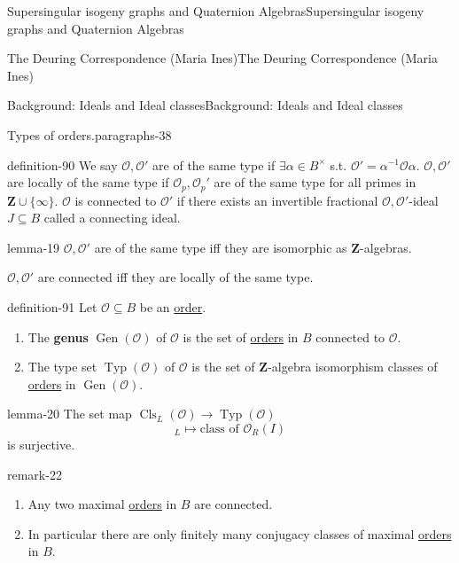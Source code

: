 \documentclass[10pt,]{book}
\newcommand{\terminology}[1]{\textbf{#1}}
\numberwithin{equation}{section}
\newcommand{\inv}{^{-1}}
\newcommand{\ZZ}{\mathbf{Z}}
\newcommand{\ints}{\mathcal{O}}
\begin{document}
\begin{chapterptx}{Supersingular isogeny graphs and Quaternion Algebras}{}{Supersingular isogeny graphs and Quaternion Algebras}{}{}
\begin{sectionptx}{The Deuring Correspondence (Maria Ines)}{}{The Deuring Correspondence (Maria Ines)}{}{}
\begin{subsectionptx}{Background: Ideals and Ideal classes}{}{Background: Ideals and Ideal classes}{}{}
\begin{paragraphs}{Types of orders.}{paragraphs-38}
\begin{definition}{}{definition-90}
\hypertarget{p-949}{}%
We say \(\ints,\ints' \) are of the same type if \(\exists \alpha \in B^\times\) s.t. \(\ints ' = \alpha \inv \ints \alpha\). \(\ints,\ints'\) are locally of the same type if \(\ints_p, \ints_p'\) are of the same type for all primes in \(\ZZ\cup\{\infty\}\). \(\ints\) is connected to  \(\ints'\) if there exists an invertible fractional \(\ints,\ints'\)-ideal \(J \subseteq B\) called a connecting ideal.%
\end{definition}
\begin{lemma}{}{}{lemma-19}%
\hypertarget{p-950}{}%
\(\ints,\ints'\) are of the same type iff they are isomorphic as \(\ZZ\)-algebras.%
\par
\hypertarget{p-951}{}%
\(\ints,\ints'\) are connected iff they are locally of the same type.%
\end{lemma}
\begin{definition}{}{definition-91}%
\hypertarget{p-952}{}%
Let \(\ints \subseteq B\) be an \hyperref[def-order-quaternion]{order}.\leavevmode%
\begin{enumerate}
\item\hypertarget{li-236}{}The \terminology{genus} \(\operatorname{Gen}(\ints)\) of \(\ints \) is the set of \hyperref[def-order-quaternion]{orders} in \(B \) connected to \(\ints\).%
\item\hypertarget{li-237}{}The type set \(\operatorname{Typ}(\ints)\) of \(\ints\) is the set of \(\ZZ\)-algebra isomorphism classes of \hyperref[def-order-quaternion]{orders} in \(\operatorname{Gen} (\ints)\).%
\end{enumerate}
%
\end{definition}
\begin{lemma}{}{}{lemma-20}%
\hypertarget{p-953}{}%
The set map \(\operatorname{Cls}_L(\ints) \to \operatorname{Typ}(\ints)\)%
\begin{equation*}
[ I]_L \mapsto \text{class of } \ints_R(I)
\end{equation*}
is surjective.%
\end{lemma}
\begin{remark}{}{remark-22}%
\hypertarget{p-954}{}%
\leavevmode%
\begin{enumerate}
\item\hypertarget{li-238}{}Any two maximal \hyperref[def-order-quaternion]{orders} in \(B\) are connected.%
\item\hypertarget{li-239}{}In particular there are only finitely many conjugacy classes of maximal \hyperref[def-order-quaternion]{orders} in \(B\).%
\end{enumerate}

\end{remark}
\end{paragraphs}
\end{subsectionptx}
\end{sectionptx}
\end{chapterptx}
\end{document}
